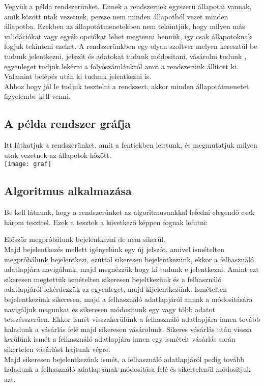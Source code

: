 \documentclass[12pt]{article}
\begin{document}
Vegyük a példa rendszerünket. Ennek a rendszernek egyszerü állapotai vannak, amik között utak vezetnek, persze nem minden állapotból vezet minden állapotba.
Ezekben az állapotátmenetekben nem teküntjük, hogy milyen más validációkat vagy egyéb opciókat lehet megtenni bennük, igy csak állapotoknak fogjuk tekinteni ezeket.
A rendszerünkben egy olyan szoftver melyen keresztül be tudunk jelentkezni, jelszót és adatokat tudunk módositani, vásárolni tudunk , egyenleget tudjuk lekérni a folyószámlánkról amit a rendszerünk állitott ki. Valamint belépés után ki tudunk jelentkezni is.\\

Ahhoz hogy jól le tudjuk tesztelni a rendszert, akkor minden állapotátmenetet figyelembe kell venni.\\

\subsection{A példa rendszer gráfja}

Itt láthatjuk a rendszerünket, amit a fentiekben leirtunk, és megmutatjuk milyen utak vezetnek az állapotok között.\\

\texttt{[image: graf]}

\subsection{Algoritmus alkalmazása}

Be kell látnunk, hogy a rendszerünket az algoritmusunkkal lefedni elegendő csak három teszttel.
Ezek a tesztek a következő képpen fognak lefutni:

Először megpróbálunk bejelentkezni de nem sikerül.\\
Majd bejelentkezés mellett igényelünk egy új jelszót, amivel ismételten megpróbálunk bejelentkezi, ezúttal sikeresen bejelentkezünk, ekkor a felhasználó adatlapjára navigálunk, majd megnézzük hogy ki tudunk e jelentkezni. Amint ezt sikeresen megtettük ismételten sikeresen bejeltkezünk és a felhasználó adatlapjáról lekérdezzük az egyenleget, majd kijelentkezünk. Ismételten bejelentkezünk sikeresen, majd a felhasználó adatlapjáról annak a módositására navigáljuk magunkat és sikeresen módositunk egy vagy több adatot tetszésszerüen. Ekkor ismét visszakerülünk a felhasználó adatlapjára innen tovább haladunk a vásárlás felé majd sikeresen vásárolunk. Sikeres vásárlás után vissza kerülünk ismét a felhasználó adatlapjára innen egy ismételt vásárlás során sikertelen vásárlást hajtunk végre.\\
Majd sikeresen bejelentkezünk ismét, a felhasználó adatlapjáról pedig tovább haladunk a felhasználó adatlapjának módositása felé és sikertelenül módositjuk azt.\\
\end{document}
